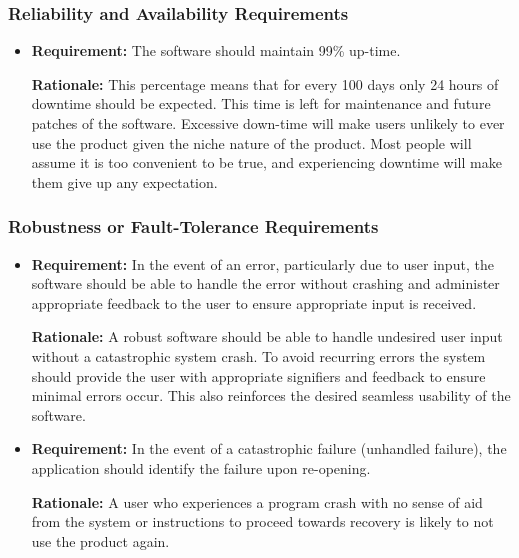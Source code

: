 \documentclass[12pt, titlepage]{article}
\begin{document}
\subsubsection{Reliability and Availability Requirements}
\begin{itemize}
    \item \textbf{Requirement:} The software should maintain 99\% up-time.
    
    \textbf{Rationale:} This percentage means that for every 100 days only 24 hours of downtime should be expected. This time is left for maintenance and future patches of the software. Excessive down-time will make users unlikely to ever use the product given the niche nature of the product. Most people will assume it is too convenient to be true, and experiencing downtime will make them give up any expectation.
\end{itemize}

\subsubsection{Robustness or Fault-Tolerance Requirements}
\begin{itemize}
    \item \textbf{Requirement:} In the event of an error, particularly due to user input, the software should be able to handle the error without crashing and administer appropriate feedback to the user to ensure appropriate input is received.
    
    \textbf{Rationale:} A robust software should be able to handle undesired user input without a catastrophic system crash. To avoid recurring errors the system should provide the user with appropriate signifiers and feedback to ensure minimal errors occur. This also reinforces the desired seamless usability of the software.
    
    \item \textbf{Requirement:} In the event of a catastrophic failure (unhandled failure), the application should identify the failure upon re-opening.
    
    \textbf{Rationale:} A user who experiences a program crash with no sense of aid from the system or instructions to proceed towards recovery is likely to not use the product again.
\end{itemize}
\end{document}
